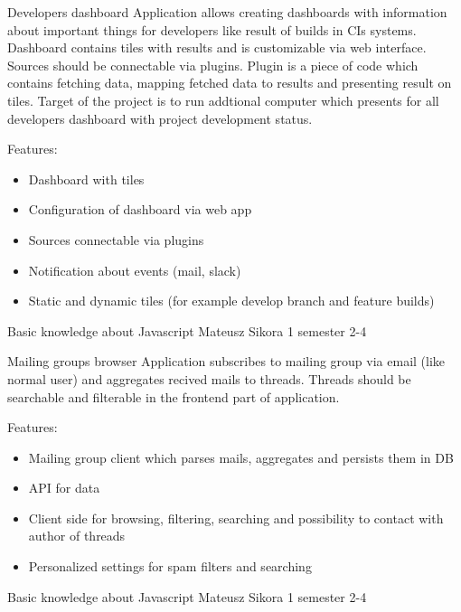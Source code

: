 \begin{project}
{Developers dashboard}
{
Application allows creating dashboards with information about important things for developers like result of builds in CIs systems. Dashboard contains tiles with results and is customizable via web interface. Sources should be connectable via plugins. Plugin is a piece of code which contains fetching data, mapping fetched data to results and presenting result on tiles.  
\bigbreak
Target of the project is to run addtional computer which presents for all developers dashboard with project development status.
}
{
Features:
\begin{itemize}
	\item Dashboard with tiles
	\item Configuration of dashboard via web app
	\item Sources connectable via plugins
	\item Notification about events (mail, slack)
	\item Static and dynamic tiles (for example develop branch and feature builds)
\end{itemize}
}
{Basic knowledge about Javascript}
{Mateusz Sikora}
{1 semester}
{2-4}
\end{project}
\begin{project}
{Mailing groups browser}
{Application subscribes to mailing group via email (like normal user) and aggregates recived mails to threads. Threads should be searchable and filterable in the frontend part of application.}
{
Features:
\begin{itemize}
	\item Mailing group client which parses mails, aggregates and persists them in DB
	\item API for data
	\item Client side for browsing, filtering, searching and possibility to contact with author of threads
	\item Personalized settings for spam filters and searching
\end{itemize}
}
{Basic knowledge about Javascript}
{Mateusz Sikora}
{1 semester}
{2-4}
\end{project}
